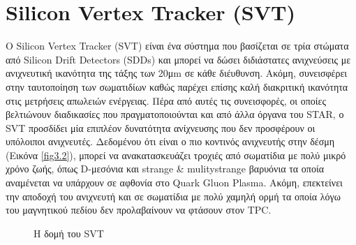 \section{Silicon Vertex Tracker (SVT)}

Ο Silicon Vertex Tracker (SVT) είναι ένα σύστημα που βασίζεται σε τρία στώματα από Silicon Drift Detectors (SDDs) και μπορεί να δώσει διδιάστατες ανιχνεύσεις με ανιχνευτική ικανότητα της τάξης των 20μm σε κάθε διέυθυνση. Ακόμη, συνεισφέρει στην ταυτοποίηση των σωματιδίων καθώς παρέχει επίσης καλή διακριτική ικανότητα στις μετρήσεις απωλειών ενέργειας. 
	Πέρα από αυτές τις συνεισφορές, οι οποίες βελτιώνουν διαδικασίες που πραγματοποιούνται και από άλλα όργανα του STAR, ο SVT προσδίδει μία επιπλέον δυνατότητα ανίχνευσης που δεν προσφέρουν οι υπόλοιποι ανιχνευτές.
	Δεδομένου ότι είναι ο πιο κοντινός ανιχνευτής στην δέσμη (Εικόνα \ref{fig3.2}), μπορεί να ανακατασκευάζει τροχιές από σωματίδια με πολύ μικρό χρόνο ζωής, όπως  D-μεσόνια και strange \& mulitystrange βαρυόνια τα οποία αναμένεται να υπάρχουν σε αφθονία στο Quark Gluon Plasma.
	Ακόμη, επεκτείνει την αποδοχή του ανιχνευτή και σε σωματίδια με πολύ χαμηλή ορμή τα οποία λόγω του μαγνητικού πεδίου δεν προλαβαίνουν να φτάσουν στον TPC.


	
	\begin{figure}[h!]
    \centering
    \qquad
    \caption{Η δομή του SVT}%
    \label{fig3.13}%
\end{figure}	
	
